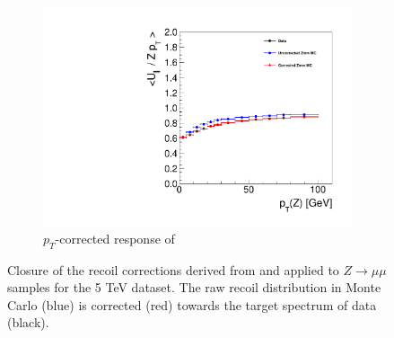 \begin{figure}
\begin{subfigure}{.50\textwidth}
\includegraphics[width=\linewidth]{plots/Recoil/validation_5/response_par.pdf}
\caption{$p_T$-corrected response of \upar}
\end{subfigure}%
\caption{Closure of the recoil corrections derived from and applied to $Z\rightarrow\mu\mu$ samples for the 5 TeV dataset. The raw recoil distribution in Monte Carlo (blue) is corrected (red) towards the target spectrum of data (black).}
\label{fig:recoil:validation:5}
\end{figure}
